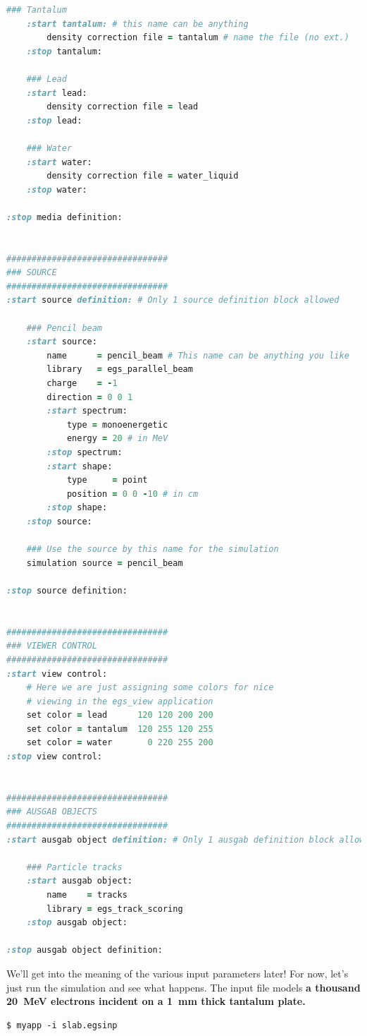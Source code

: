 \documentclass[12pt,twoside]{article}
\begin{document}
\begin{lstlisting}[language=ruby,backgroundcolor=\color{white}]
    ### Tantalum
    :start tantalum: # this name can be anything
        density correction file = tantalum # name the file (no ext.)
    :stop tantalum:

    ### Lead
    :start lead:
        density correction file = lead
    :stop lead:

    ### Water
    :start water:
        density correction file = water_liquid
    :stop water:

:stop media definition:


################################
### SOURCE
################################
:start source definition: # Only 1 source definition block allowed

    ### Pencil beam
    :start source:
        name      = pencil_beam # This name can be anything you like
        library   = egs_parallel_beam
        charge    = -1
        direction = 0 0 1
        :start spectrum:
            type = monoenergetic
            energy = 20 # in MeV
        :stop spectrum:
        :start shape:
            type     = point
            position = 0 0 -10 # in cm
        :stop shape:
    :stop source:

    ### Use the source by this name for the simulation
    simulation source = pencil_beam

:stop source definition:


################################
### VIEWER CONTROL
################################
:start view control:
    # Here we are just assigning some colors for nice
    # viewing in the egs_view application
    set color = lead      120 120 200 200
    set color = tantalum  120 255 120 255
    set color = water       0 220 255 200
:stop view control:


################################
### AUSGAB OBJECTS
################################
:start ausgab object definition: # Only 1 ausgab definition block allowed

    ### Particle tracks
    :start ausgab object:
        name    = tracks
        library = egs_track_scoring
    :stop ausgab object:

:stop ausgab object definition:
\end{lstlisting}

We'll get into the meaning of the various input parameters later! For now,
let's just run the simulation and see what happens. The input file models
\textbf{a thousand 20~MeV electrons incident on a 1~mm
thick tantalum plate.}

\begin{lstlisting}
$ myapp -i slab.egsinp
\end{lstlisting}
\end{document}
